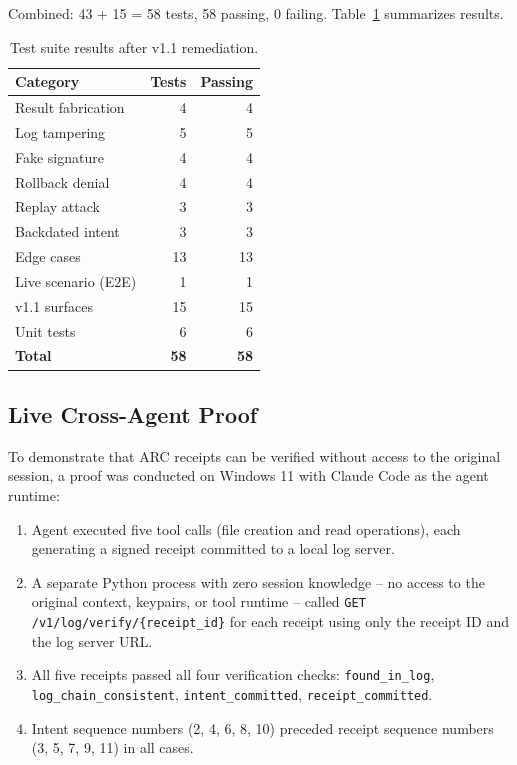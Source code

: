 \documentclass[10pt,twocolumn]{article}
\begin{document}
Combined: 43 + 15 = 58 tests, 58 passing, 0 failing. Table~\ref{tab:results}
summarizes results.

\begin{table}[h]
\centering
\footnotesize
\caption{Test suite results after v1.1 remediation.}
\label{tab:results}
\begin{tabular}{lrr}
\toprule
\textbf{Category} & \textbf{Tests} & \textbf{Passing} \\
\midrule
Result fabrication     & 4  & 4  \\
Log tampering          & 5  & 5  \\
Fake signature         & 4  & 4  \\
Rollback denial        & 4  & 4  \\
Replay attack          & 3  & 3  \\
Backdated intent       & 3  & 3  \\
Edge cases             & 13 & 13 \\
Live scenario (E2E)    & 1  & 1  \\
v1.1 surfaces          & 15 & 15 \\
Unit tests             & 6  & 6  \\
\midrule
\textbf{Total}         & \textbf{58} & \textbf{58} \\
\bottomrule
\end{tabular}
\end{table}

\subsection{Live Cross-Agent Proof}

To demonstrate that ARC receipts can be verified without access to the
original session, a proof was conducted on Windows 11 with Claude Code
as the agent runtime:

\begin{enumerate}[noitemsep,topsep=2pt]
  \item Agent executed five tool calls (file creation and read operations),
    each generating a signed receipt committed to a local log server.
  \item A separate Python process with zero session knowledge -- no access
    to the original context, keypairs, or tool runtime -- called
    \texttt{GET /v1/log/verify/\{receipt\_id\}} for each receipt using
    only the receipt ID and the log server URL.
  \item All five receipts passed all four verification checks:
    \texttt{found\_in\_log}, \texttt{log\_chain\_consistent},
    \texttt{intent\_committed}, \texttt{receipt\_committed}.
  \item Intent sequence numbers (2, 4, 6, 8, 10) preceded receipt
    sequence numbers (3, 5, 7, 9, 11) in all cases.
\end{enumerate}
\end{document}
